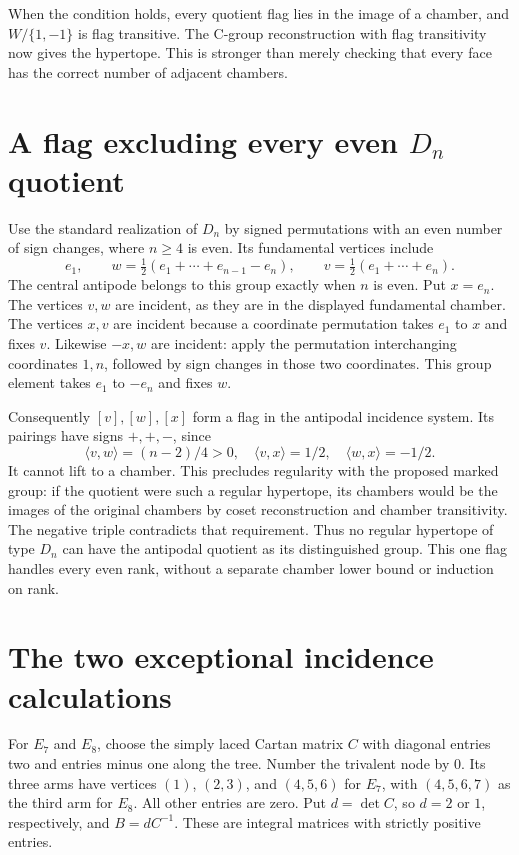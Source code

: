 \documentclass[11pt,a4paper]{article}
\begin{document}
When the condition holds, every quotient flag lies in the image of a
chamber, and $W/\{1,-1\}$ is flag transitive. The C-group reconstruction
with flag transitivity now gives the hypertope. This is stronger than merely
checking that every face has the correct number of adjacent chambers.

\section{A flag excluding every even \texorpdfstring{$D_n$}{Dn} quotient}

Use the standard realization of $D_n$ by signed permutations with an even
number of sign changes, where $n\geq4$ is even. Its fundamental vertices
include
\[
 e_1,\qquad
 w=\tfrac12(e_1+\cdots+e_{n-1}-e_n),\qquad
 v=\tfrac12(e_1+\cdots+e_n).
\]
The central antipode belongs to this group exactly when $n$ is even.
Put $x=e_n$. The vertices $v,w$ are incident, as they are in the displayed
fundamental chamber. The vertices $x,v$ are incident because a coordinate
permutation takes $e_1$ to $x$ and fixes $v$. Likewise $-x,w$ are incident:
apply the permutation interchanging coordinates $1,n$, followed by sign
changes in those two coordinates. This group element takes $e_1$ to $-e_n$
and fixes $w$.

Consequently $[v],[w],[x]$ form a flag in the antipodal incidence system.
Its pairings have signs $+,+,-$, since
\[
 \langle v,w\rangle=(n-2)/4>0,\quad
 \langle v,x\rangle=1/2,\quad
 \langle w,x\rangle=-1/2.
\]
It cannot lift to a chamber. This precludes regularity with the proposed
marked group: if the quotient were such a regular hypertope,
its chambers would be the images of the original chambers by coset
reconstruction and chamber transitivity. The negative triple contradicts
that requirement. Thus no regular hypertope of type $D_n$ can have the
antipodal quotient as its distinguished group. This one flag handles every
even rank, without a separate chamber lower bound or induction on rank.

\section{The two exceptional incidence calculations}

For $E_7$ and $E_8$, choose the simply laced Cartan matrix $C$ with diagonal
entries two and entries minus one along the tree. Number the trivalent
node by $0$. Its three arms have vertices $(1)$, $(2,3)$, and $(4,5,6)$
for $E_7$, with $(4,5,6,7)$ as the third arm for $E_8$. All other
entries are zero. Put $d=\det C$, so $d=2$ or $1$, respectively, and
$B=dC^{-1}$. These are integral matrices with strictly positive entries.
\end{document}
